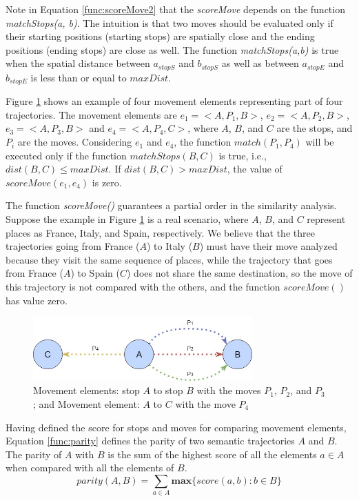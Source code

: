 Note in Equation \ref{func:scoreMove2} that the \emph{scoreMove} depends on the function \textit{matchStops(a, b)}. {The intuition is that two moves should be evaluated only if their starting positions (starting stops) are spatially close and the ending positions (ending stops) are close as well.}
The function \emph{matchStops(a,b)} is true when the {spatial distance} between $a_{stopS}$ and $b_{stopS}$  as well as between $a_{stopE}$ and $b_{stopE}$ is less than or equal to $maxDist$.

{Figure {\ref{fig:move}} shows an example of four movement elements representing part of four trajectories. The movement elements are $e_1=<A, P_1, B>$, $e_2=<A, P_2, B>$, $e_3=<A, P_3, B>$ and $e_4=<A, P_4, C>$, where $A$, $B$, and $C$ are the stops, and $P_i$ are the moves. Considering $e_1$ and $e_4$, the function $match(P_1,P_4)$ will be executed only if the function $matchStops(B,C)$ is true, i.e., $dist(B,C) \leq  maxDist$. If $dist(B,C) > maxDist$, the value of $scoreMove(e_1,e_4)$ is zero.
}

{The function \emph{scoreMove()} guarantees a partial order in the similarity analysis.
Suppose the example in  Figure {\ref{fig:move}} is a real scenario, where $A$, $B$, and $C$ represent  places as France, Italy, and Spain, respectively. We believe that the three trajectories going from France ($A$) to Italy ($B$) must have their move analyzed because they visit the same sequence of places, while the trajectory that goes from France ($A$) to Spain ($C$) does not share the same destination, so the move of this trajectory is not compared with the others, and the function $scoreMove()$ has value zero.}



\begin{figure}[h]
\centering
\includegraphics[width=0.75\textwidth]{Images/Toy_trajectories.jpg}
\caption{\label{fig:move} Movement elements: stop $A$ to stop $B$ with the moves $P_1$, $P_2$, and $P_3$; and Movement element: $A$ to $C$ with the move $P_4$}
\end{figure}

Having defined the score for stops and moves for comparing movement elements, Equation \ref{func:parity} defines the parity of two semantic trajectories $A$ and $B$. The parity of $A$ with $B$ is the sum of the highest score of all the elements $a \in A$ when compared with all the elements of $B$.
\begin{equation}
\label{func:parity}
parity(A, B) = \sum\limits_{a\in A} \textbf{max}\{\textit{score}(a, b) : b \in B\}
\end{equation}

